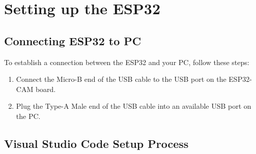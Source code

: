 %
%
%



	

\chapter{Setting up the ESP32}

\section{Connecting ESP32 to PC}
To establish a connection between the ESP32 and your PC, follow these steps:

\begin{enumerate}
    \item Connect the Micro-B end of the USB cable to the USB port on the ESP32-CAM board.
    \item Plug the Type-A Male end of the USB cable into an available USB port on the PC.
\end{enumerate}

\section{Visual Studio Code Setup Process}

